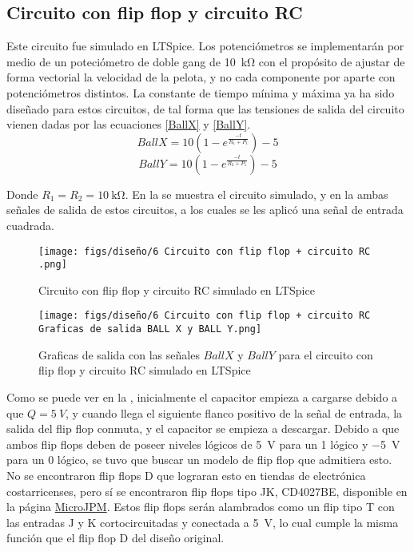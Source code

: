 \subsection{Circuito con flip flop y circuito RC}
Este circuito fue simulado en LTSpice.
Los potenciómetros se implementarán por medio de un poteciómetro de doble gang de \SI{10}{\kohm} con el propósito de ajustar de forma vectorial la velocidad de la pelota, y no cada componente por aparte con potenciómetros distintos. 
La constante de tiempo mínima y máxima ya ha sido diseñado para estos circuitos, de tal forma que las tensiones de salida del circuito vienen dadas por las ecuaciones \eqref{BallX} y \eqref{BallY}.
\begin{equation}
    BallX = 10\left(1 - e^{\frac{-t}{R_1 + P_1}}\right) -5\label{BallX}
\end{equation}
\begin{equation}
    BallY = 10\left(1 - e^{\frac{-t}{R_2 + P_1}}\right) -5\label{BallY}
\end{equation}

Donde $R_1 = R_2 = \SI{10}{\kohm}$. 
En la  se muestra el circuito simulado, y en la  ambas señales de salida de estos circuitos, a los cuales se les aplicó una señal de entrada cuadrada. 

\begin{figure}[H]
    \centering
    \texttt{[image: figs/diseño/6 Circuito con flip flop + circuito RC .png]}
    \caption{Circuito con flip flop y circuito RC simulado en LTSpice}
    \label{FFRC}
\end{figure}

\begin{figure}[H]
    \centering
    \texttt{[image: figs/diseño/6 Circuito con flip flop + circuito RC Graficas de salida BALL X y BALL Y.png]}
    \caption{Graficas de salida con las señales $BallX$ y $BallY$ para el circuito con flip flop y circuito RC simulado en LTSpice}
    \label{GraficaFFRC}
\end{figure}

Como se puede ver en la , inicialmente el capacitor empieza a cargarse debido a que $Q=\SI{5}{V}$, y cuando llega el siguiente flanco positivo de la señal de entrada, la salida del flip flop conmuta, y el capacitor se empieza a descargar.
Debido a que ambos flip flops deben de poseer niveles lógicos de \SI{5}{V} para un 1 lógico y \SI{-5}{V} para un 0 lógico, se tuvo que buscar un modelo de flip flop que admitiera esto.
No se encontraron flip flops D que lograran esto en tiendas de electrónica costarricenses, pero sí se encontraron flip flops tipo JK, CD4027BE, disponible en la página \href{https://www.microjpm.com/products/ad32124/}{MicroJPM}.
Estos flip flops serán alambrados como un flip tipo T con las entradas J y K cortocircuitadas y conectada a \SI{5}{V}, lo cual cumple la misma función que el flip flop D del diseño original.


